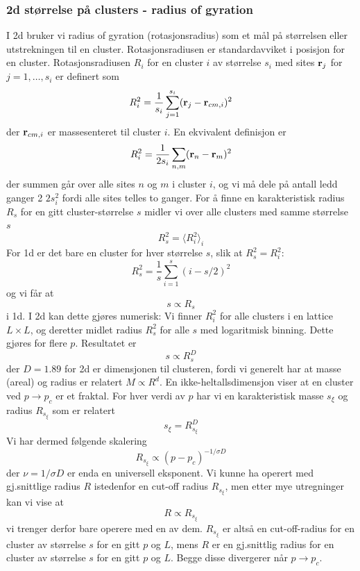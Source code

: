\documentclass[english, a4paper]{article}
\begin{document}
\subsubsection{2d størrelse på clusters - radius of gyration}
I 2d bruker vi radius of gyration (rotasjonsradius) som et mål på størrelsen eller utstrekningen 
til en cluster. Rotasjonsradiusen er standardavviket i posisjon for en cluster. Rotasjonsradiusen
$R_i$ for en cluster $i$ av størrelse $s_i$ med sites ${\bf r}_j$ for $j = 1,\dots,s_i$ er definert som
\begin{equation}
 R_i^2 = \frac{1}{s_i}\sum_{j=1}^{s_i} ({\bf r}_j - {\bf r}_{cm,i})^2
\end{equation}
der ${\bf r}_{cm,i}$ er massesenteret til cluster $i$. En ekvivalent definisjon er
\begin{equation}
 R_i^2 = \frac{1}{2s_i}\sum_{n,m} ({\bf r}_n - {\bf r}_m)^2
\end{equation}
der summen går over alle sites $n$ og $m$ i cluster $i$, og vi må dele på antall ledd ganger 2 $2s_i^2$
fordi alle sites telles to ganger. For å finne en karakteristisk radius $R_s$ for en gitt cluster-størrelse $s$
midler vi over alle clusters med samme størrelse $s$
\begin{equation}
 R_s^2 = \langle R_i^2 \rangle_i
\end{equation}
For 1d er det bare en cluster for hver størrelse $s$, slik at $R_s^2 = R_i^2$:
\begin{equation}
 R_s^2 = \frac{1}{s} \sum_{i=1}^s(i - s/2)^2
\end{equation}
og vi får at 
\begin{equation}
 s \propto R_s
\end{equation}
i 1d. I 2d kan dette gjøres numerisk: Vi finner $R_i^2$ for alle clusters i en lattice $L\times L$, og deretter
midlet radius $R_s^2$ for alle $s$ med logaritmisk binning. Dette gjøres for flere $p$. Resultatet er
\begin{equation}
 s \propto R_s^D
\end{equation}
der $D = 1.89$ for 2d er dimensjonen til clusteren, fordi vi generelt har at masse (areal) og radius er
relatert $M \propto R^d$. En ikke-heltallsdimensjon viser at en cluster ved $p \to p_c$ er et fraktal. 
For hver verdi av $p$ har vi en karakteristisk masse $s_\xi$ og radius $R_{s_\xi}$ som er relatert
\begin{equation}
 s_\xi = R_{s_\xi}^D
\end{equation}
Vi har dermed følgende skalering
\begin{equation}
 R_{s_\xi} \propto (p - p_c)^{-1/\sigma D}
\end{equation}
der $\nu = 1/\sigma D$ er enda en universell eksponent. Vi kunne ha operert med gj.snittlige radius $R$
istedenfor en cut-off radius $R_{s_\xi}$, men etter mye utregninger kan vi vise at
\begin{equation}
 R \propto R_{s_\xi}
\end{equation}
vi trenger derfor bare operere med en av dem. $R_{s_\xi}$ er altså en cut-off-radius
for en cluster av størrelse $s$ for en gitt $p$ og $L$, mens $R$ er en gj.snittlig
radius for en cluster av størrelse $s$ for en gitt $p$ og $L$. Begge disse divergerer
når $p \to p_c$. 
\end{document}
